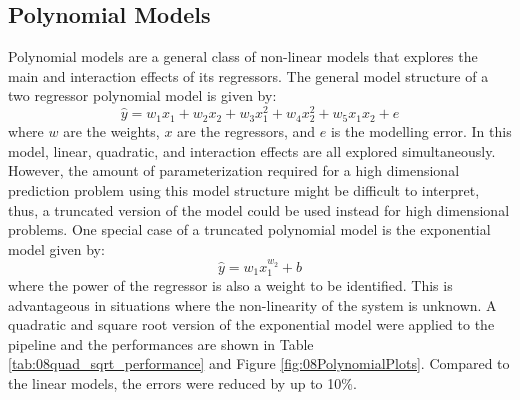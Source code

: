 \subsection{Polynomial Models}
Polynomial models are a general class of non-linear models that explores the main and interaction effects of its regressors.  The general model structure of a two regressor polynomial model is given by:
\begin{equation}
    \hat{y} = w_1x_1 + w_2x_2 + w_3x_1^2 + w_4x_2^2 + w_5x_1x_2 + e
\end{equation}
where $w$ are the weights, $x$ are the regressors, and $e$ is the modelling error.  In this model, linear, quadratic, and interaction effects are all explored simultaneously. However, the amount of parameterization required for a high dimensional prediction problem using this model structure might be difficult to interpret, thus, a truncated version of the model could be used instead for high dimensional problems. One special case of a truncated polynomial model is the exponential model given by:
\begin{equation}
    \hat{y} = w_1 x_1^{w_2} + b
\end{equation}
where the power of the regressor is also a weight to be identified. This is advantageous in situations where the non-linearity of the system is unknown. A quadratic and square root version of the exponential model were applied to the pipeline and the performances are shown in Table \ref{tab:08quad_sqrt_performance} and Figure \ref{fig:08PolynomialPlots}.  Compared to the linear models, the errors were reduced by up to 10\%.

